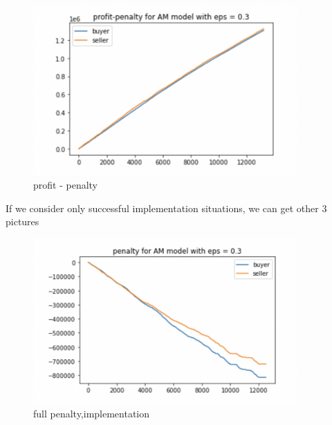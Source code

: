 \documentclass[11pt]{article}
\begin{document}
\begin{figure}[H]
	\begin{center}
	\includegraphics[width=0.9\textwidth]{45.PNG}
	\end{center}
	\caption{profit - penalty}
	\label{FIG.45}
\end{figure}	

If we consider only successful implementation situations, we can get other 3 pictures

\begin{figure}[H]
	\begin{center}
	\includegraphics[width=0.9\textwidth]{46.PNG}
	\end{center}
	\caption{full penalty,implementation}
	\label{FIG.46}
\end{figure}
\end{document}

